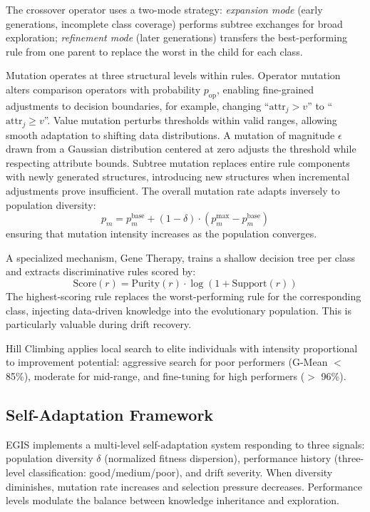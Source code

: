 \documentclass[lettersize,journal]{IEEEtran}
\begin{document}
The crossover operator uses a two-mode strategy: \textit{expansion mode} (early generations, incomplete class coverage) performs subtree exchanges for broad exploration; \textit{refinement mode} (later generations) transfers the best-performing rule from one parent to replace the worst in the child for each class.

Mutation operates at three structural levels within rules. Operator mutation alters comparison operators with probability $p_{\text{op}}$, enabling fine-grained adjustments to decision boundaries, for example, changing ``$\text{attr}_j > v$'' to ``$\text{attr}_j \geq v$''. Value mutation perturbs thresholds within valid ranges, allowing smooth adaptation to shifting data distributions. A mutation of magnitude $\epsilon$ drawn from a Gaussian distribution centered at zero adjusts the threshold while respecting attribute bounds. Subtree mutation replaces entire rule components with newly generated structures, introducing new structures when incremental adjustments prove insufficient. The overall mutation rate adapts inversely to population diversity:
\begin{equation}
    p_m = p_m^{\text{base}} + (1 - \delta) \cdot (p_m^{\max} - p_m^{\text{base}})
\end{equation}
ensuring that mutation intensity increases as the population converges.

A specialized mechanism, Gene Therapy, trains a shallow decision tree per class and extracts discriminative rules scored by:
\begin{equation}
    \text{Score}(r) = \text{Purity}(r) \cdot \log(1 + \text{Support}(r))
\end{equation}
The highest-scoring rule replaces the worst-performing rule for the corresponding class, injecting data-driven knowledge into the evolutionary population. This is particularly valuable during drift recovery.

Hill Climbing applies local search to elite individuals with intensity proportional to improvement potential: aggressive search for poor performers (G-Mean $<$ 85\%), moderate for mid-range, and fine-tuning for high performers ($>$ 96\%).


\subsection{Self-Adaptation Framework}

EGIS implements a multi-level self-adaptation system responding to three signals: population diversity $\delta$ (normalized fitness dispersion), performance history (three-level classification: good/medium/poor), and drift severity. When diversity diminishes, mutation rate increases and selection pressure decreases. Performance levels modulate the balance between knowledge inheritance and exploration.
\end{document}
